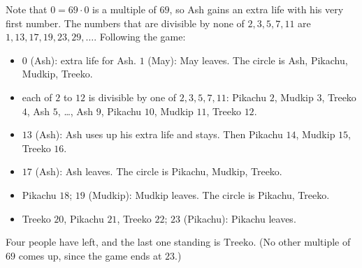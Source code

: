 Note that $0=69\cdot0$ is a multiple of $69$, so Ash gains an extra life with his very first number. The numbers that are divisible by none of $2,3,5,7,11$ are $1,13,17,19,23,29,\dots$. Following the game:
\begin{itemize}
\item $0$ (Ash): extra life for Ash. $1$ (May): May leaves. The circle is Ash, Pikachu, Mudkip, Treeko.
\item each of $2$ to $12$ is divisible by one of $2,3,5,7,11$: Pikachu $2$, Mudkip $3$, Treeko $4$, Ash $5$, \dots, Ash $9$, Pikachu $10$, Mudkip $11$, Treeko $12$.
\item $13$ (Ash): Ash uses up his extra life and stays. Then Pikachu $14$, Mudkip $15$, Treeko $16$.
\item $17$ (Ash): Ash leaves. The circle is Pikachu, Mudkip, Treeko.
\item Pikachu $18$; $19$ (Mudkip): Mudkip leaves. The circle is Pikachu, Treeko.
\item Treeko $20$, Pikachu $21$, Treeko $22$; $23$ (Pikachu): Pikachu leaves.
\end{itemize}
Four people have left, and the last one standing is $\boxed{\text{Treeko}}$. (No other multiple of $69$ comes up, since the game ends at $23$.)

